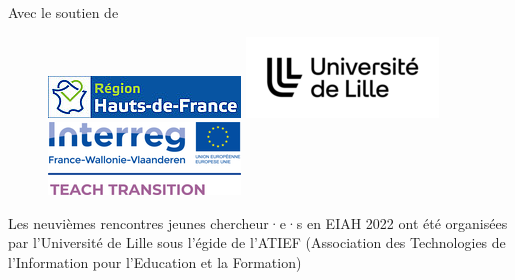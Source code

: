 \noindent Avec le soutien de

\begin{figure}[!ht]
	\centering
	\includegraphics[width=.18\textwidth,valign=m]{Content/figures/regionHautDeFrance.jpg}\hfill
	\includegraphics[width=.18\textwidth,valign=m]{Content/figures/univLille.png}\hfill
	\includegraphics[width=.18\textwidth,valign=m]{Content/figures/interreg.png}\hfill
\end{figure}

\begin{center}
	\small{Les neuvièmes rencontres jeunes chercheur·e·s en EIAH 2022 ont été organisées par l’Université de Lille sous l’égide de l’ATIEF (Association des Technologies de l’Information pour l’Education et la Formation)}
\end{center}

\restoregeometry
\newpage